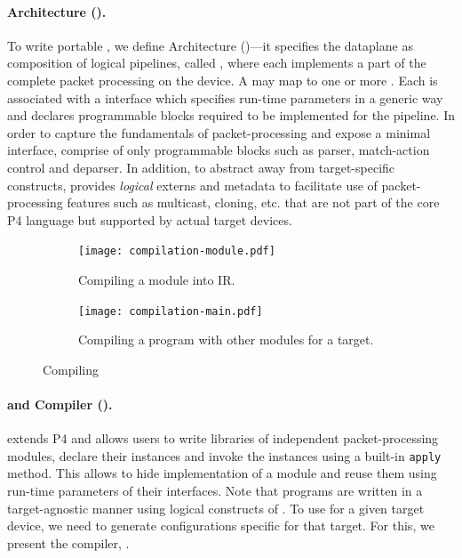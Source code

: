 \documentclass[letterpaper,twocolumn,10pt]{article}
\begin{document}
\paragraph{\uswitch Architecture (\uarch).}
To write portable \uprograms, we define \uswitch Architecture
(\uarch)---it specifies the dataplane as composition of logical
pipelines, called \emph{\upipeline}, where each \upipeline implements
a part of the complete packet processing on the device. A \upipeline
may map to one or more \uprograms. Each \upipeline is associated with
a \uarch interface which specifies run-time parameters in a generic
way and declares programmable blocks required to be implemented for
the pipeline. In order to capture the fundamentals of
packet-processing and expose a minimal interface, \upipelines comprise
of only programmable blocks such as parser,
match-action control and deparser. In addition, to abstract
away from target-specific constructs, \uarch provides \emph{logical}
externs and metadata to facilitate use of packet-processing features
such as multicast, cloning, etc. that are not part of the core P4
language but supported by actual target devices.

\begin{figure}[!tbp]
  \begin{subfigure}{\linewidth}
    \centering
    \texttt{[image: compilation-module.pdf]}
    \caption{Compiling a \ulang module into IR.}
    \label{fig:compile-module}
  \end{subfigure}
  \begin{subfigure}{\linewidth}
    \centering
    \texttt{[image: compilation-main.pdf]}
    \caption{Compiling a \ulang program with other modules for a
    target.}
    \label{fig:compile-to-target}
  \end{subfigure}
  \caption{Compiling \uprograms}
  \label{fig:compiler-workflow}
\end{figure}

\paragraph{\ulang and Compiler (\ucomp).}%
\ulang extends P4 and allows users to write libraries of independent
packet-processing modules, declare their instances and invoke the
instances using a built-in \texttt{apply} method. This allows to hide
implementation of a module and reuse them using run-time parameters of
their interfaces. Note that \ulang programs are written in a
target-agnostic manner using logical constructs of \uarch. To use
\ulang for a given target device, we need to generate configurations
specific for that target. For this, we present the \ulang compiler,
\ucomp.
\end{document}

